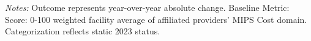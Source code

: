 \begin{table}[htbp]
    \centering
    \caption{Timeline of Change in Facility Avg: MIPS Cost by Authority}
    \label{tab:d_fac_mips_cost_score_timeline}
    \vspace{0.2cm}
    \vspace{0.1cm}
    \begin{minipage}{\textwidth}
        \footnotesize \textit{Notes:} Outcome represents year-over-year absolute change. Baseline Metric: Score: 0-100 weighted facility average of affiliated providers' MIPS Cost domain. Categorization reflects static 2023 status.
    \end{minipage}
\end{table}